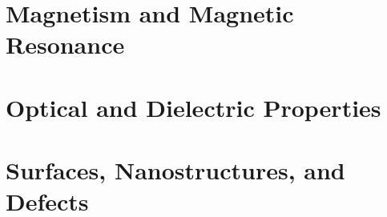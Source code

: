 \documentclass[12pt, oneside]{book}
\begin{document}


\part{Magnetism and Magnetic Resonance}





\part{Optical and Dielectric Properties}





\part{Surfaces, Nanostructures, and Defects}








\printbibliography[heading=bibintoc, title={References}]
\end{document}
